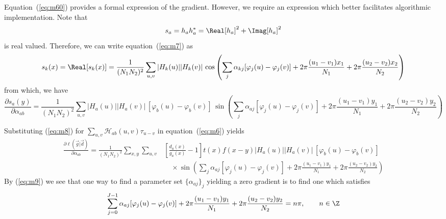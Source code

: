 Equation~(\ref{eq:m60}) provides a formal expression of the gradient.
However, we require an expression which better facilitates algorithmic implementation.
Note that 
\[
s_a = h_a h_a^* = \Real[h_a]^2 + \Imag[h_a]^2
\]
is real valued.  Therefore, we can write equation~(\ref{eq:m7}) as
\[
s_k(x) = \Real [s_k(x)] = \frac{1}{(N_1N_2)^2} \sum_{u,v} |H_k(u)||H_k(v)|
\,\cos\left(\sum_j \alpha_{kj}[\varphi_j(u)-\varphi_j(v)] +
  2\pi\frac{(u_1-v_1)x_1}{N_1}+ 2\pi\frac{(u_2-v_2)x_2}{N_2}\right)
\]
from which, we have
\begin{equation}\label{eq:m8}
\frac{\partial s_a(y)}{\partial \alpha_{ab}} %
= \frac{1}{(N_1N_2)^2} \sum_{u,v} |H_a(u)||H_a(v)|\,[\varphi_b(u)-\varphi_b(v)]\,
\sin \left(\sum_j \alpha_{aj}[\varphi_j(u)-\varphi_j(v)] + %
  2\pi\frac{(u_1-v_1)y_1}{N_1}+ 2\pi\frac{(u_2-v_2)y_2}{N_2}\right)
\end{equation}

Substituting (\ref{eq:m8}) for $\sum_{u,v}\mathcal{H}_{ab}(u,v) \tau_{u-v}$ in
equation~(\ref{eq:m6}) yields
\begin{align}\label{eq:m9}
\frac{\partial \ell\left(\vec{g} |\vec{d}\right)}{\partial \alpha_{ab}}  
= \frac{1}{(N_1N_2)^2} \sum_{x,y}\sum_{u,v} 
      &\left[\frac{d_a(x)}{g_a(x)}-1\right]t(x)f(x-y)|H_a(u)||H_a(v)|\,[\varphi_b(u)-\varphi_b(v)] \\
      & \quad \times \sin \left(\sum_j \alpha_{aj}[\varphi_j(u)-\varphi_j(v)] + %
  2\pi\frac{(u_1-v_1)y_1}{N_1}+ 2\pi\frac{(u_2-v_2)y_2}{N_2}\right)\nonumber
\end{align}
By (\ref{eq:m9}) we see that one way to find a parameter set 
$\{\alpha_{aj}\}_j$ yielding a zero gradient is to find one which satisfies
\begin{equation}\label{eq:m10}
\sum_{j=0}^{J-1} \alpha_{aj}[\varphi_j(u)-\varphi_j(v)] + %
  2\pi\frac{(u_1-v_1)y_1}{N_1}+ 2\pi\frac{(u_2-v_2)y_2}{N_2} = n\pi, \qquad n \in \Z
\end{equation}

